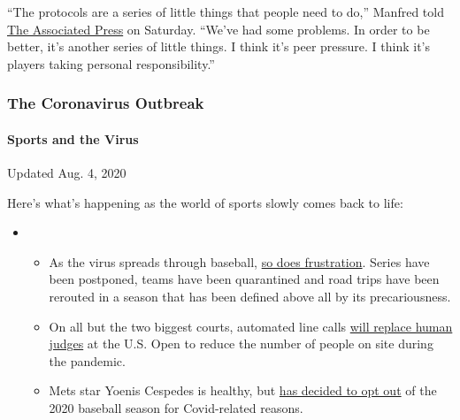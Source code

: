 ``The protocols are a series of little things that people need to do,''
Manfred told
\href{https://apnews.com/eff9d34788720e0b3d6df53c2779fd01}{The
Associated Press} on Saturday. ``We've had some problems. In order to be
better, it's another series of little things. I think it's peer
pressure. I think it's players taking personal responsibility.''

\hypertarget{the-coronavirus-outbreak}{%
\subsubsection{The Coronavirus
Outbreak}\label{the-coronavirus-outbreak}}

\hypertarget{sports-and-the-virus}{%
\paragraph{Sports and the Virus}\label{sports-and-the-virus}}

Updated Aug. 4, 2020

Here's what's happening as the world of sports slowly comes back to
life:

\begin{itemize}
\item
  \begin{itemize}
  \tightlist
  \item
    As the virus spreads through baseball,
    \href{https://www.nytimes3xbfgragh.onion/2020/08/03/sports/baseball/mlb-coronavirus-outbreak.html?action=click\&pgtype=Article\&state=default\&region=MAIN_CONTENT_2\&context=storylines_keepup}{so
    does frustration}. Series have been postponed, teams have been
    quarantined and road trips have been rerouted in a season that has
    been defined above all by its precariousness.
  \item
    On all but the two biggest courts, automated line calls
    \href{https://www.nytimes3xbfgragh.onion/2020/08/03/sports/tennis/us-open-hawkeye-line-judges.html?action=click\&pgtype=Article\&state=default\&region=MAIN_CONTENT_2\&context=storylines_keepup}{will
    replace human judges} at the U.S. Open to reduce the number of
    people on site during the pandemic.
  \item
    Mets star Yoenis Cespedes is healthy, but
    \href{https://www.nytimes3xbfgragh.onion/2020/08/02/sports/baseball/Yoenis-cespedes-opt-out-rule.html?action=click\&pgtype=Article\&state=default\&region=MAIN_CONTENT_2\&context=storylines_keepup}{has
    decided to opt out} of the 2020 baseball season for Covid-related
    reasons.
  \end{itemize}
\end{itemize}

